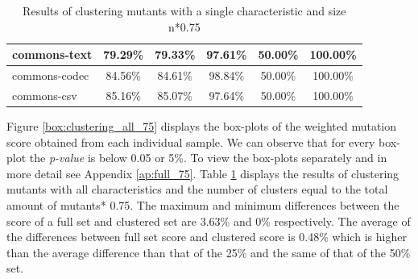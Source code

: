 \documentclass[../../main]{subfiles}
\begin{document}
\begin{table}[!htb]
\begin{tabular}{|l|c|c|c|c|c|}
commons-text                  & 79.29\%                                                                                 & 79.33\%                                                                                     & 97.61\%                                                                              & 50.00\%                                                                               & 100.00\%                                                                             \\ \hline
commons-codec                 & 84.56\%                                                                                 & 84.61\%                                                                                     & 98.84\%                                                                              & 50.00\%                                                                               & 100.00\%                                                                             \\ \hline
commons-csv                   & 85.16\%                                                                                 & 85.07\%                                                                                     & 97.64\%                                                                              & 50.00\%                                                                               & 100.00\%                                                                             \\ \hline
\end{tabular}
\caption{\label{tab:clustering_all_75}Results of clustering mutants with a single characteristic and size n*0.75}
\end{table}
\FloatBarrier

Figure \ref{box:clustering_all_75} displays the box-plots of the weighted mutation score obtained from each individual sample. 
We can observe that for every box-plot the \textit{p-value} is below 0.05 or 5\%.
To view the box-plots separately and in more detail see Appendix \ref{ap:full_75}.
Table \ref{tab:clustering_all_75} displays the results of clustering mutants with all characteristics and the number of clusters equal to the total amount of mutants* 0.75.  
The maximum and minimum differences between the score of a full set and clustered set are 3.63\% and 0\% respectively.  
The average of the differences between full set score and clustered score is 0.48\% which is higher than the average difference than that of the 25\% and the same of that of the 50\% set.
\end{document}
